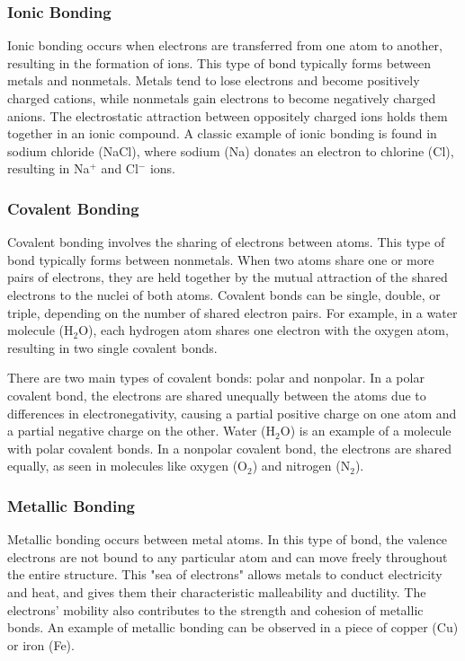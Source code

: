 \documentclass[10pt, roman]{article}
\begin{document}
\subsubsection*{Ionic Bonding}

Ionic bonding occurs when electrons are transferred from one atom to another, resulting in the formation of ions.
This type of bond typically forms between metals and nonmetals.
Metals tend to lose electrons and become positively charged cations, while nonmetals gain electrons to become negatively charged anions.
The electrostatic attraction between oppositely charged ions holds them together in an ionic compound.
A classic example of ionic bonding is found in sodium chloride (NaCl), where sodium (Na) donates an electron to chlorine (Cl), resulting in Na\(^+\) and Cl\(^-\) ions.

\subsubsection*{Covalent Bonding}

Covalent bonding involves the sharing of electrons between atoms.
This type of bond typically forms between nonmetals.
When two atoms share one or more pairs of electrons, they are held together by the mutual attraction of the shared electrons to the nuclei of both atoms.
Covalent bonds can be single, double, or triple, depending on the number of shared electron pairs.
For example, in a water molecule (H\(_2\)O), each hydrogen atom shares one electron with the oxygen atom, resulting in two single covalent bonds.

There are two main types of covalent bonds: polar and nonpolar.
In a polar covalent bond, the electrons are shared unequally between the atoms due to differences in electronegativity, causing a partial positive charge on one atom and a partial negative charge on the other.
Water (H\(_2\)O) is an example of a molecule with polar covalent bonds.
In a nonpolar covalent bond, the electrons are shared equally, as seen in molecules like oxygen (O\(_2\)) and nitrogen (N\(_2\)).

\subsubsection*{Metallic Bonding}

Metallic bonding occurs between metal atoms.
In this type of bond, the valence electrons are not bound to any particular atom and can move freely throughout the entire structure.
This "sea of electrons" allows metals to conduct electricity and heat, and gives them their characteristic malleability and ductility.
The electrons' mobility also contributes to the strength and cohesion of metallic bonds.
An example of metallic bonding can be observed in a piece of copper (Cu) or iron (Fe).
\end{document}
